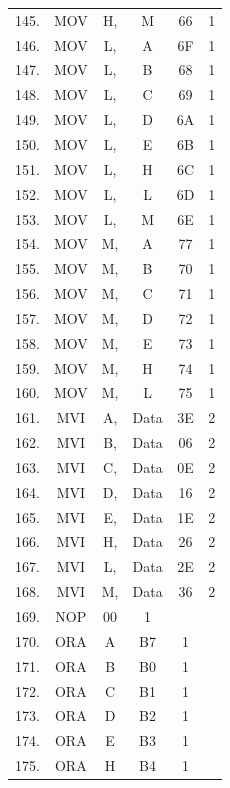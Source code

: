 \documentclass{scrreprt}
\begin{document}
\begin{longtable}{|c|c|c|c|c|c|}
145. & MOV  & H,           & M    & 66 & 1 \\
146. & MOV  & L,           & A    & 6F & 1 \\
147. & MOV  & L,           & B    & 68 & 1 \\
148. & MOV  & L,           & C    & 69 & 1 \\
149. & MOV  & L,           & D    & 6A & 1 \\
150. & MOV  & L,           & E    & 6B & 1 \\
151. & MOV  & L,           & H    & 6C & 1 \\
152. & MOV  & L,           & L    & 6D & 1 \\
153. & MOV  & L,           & M    & 6E & 1 \\
154. & MOV  & M,           & A    & 77 & 1 \\
155. & MOV  & M,           & B    & 70 & 1 \\
156. & MOV  & M,           & C    & 71 & 1 \\
157. & MOV  & M,           & D    & 72 & 1 \\
158. & MOV  & M,           & E    & 73 & 1 \\
159. & MOV  & M,           & H    & 74 & 1 \\
160. & MOV  & M,           & L    & 75 & 1 \\
161. & MVI  & A,           & Data & 3E & 2 \\
162. & MVI  & B,           & Data & 06 & 2 \\
163. & MVI  & C,           & Data & 0E & 2 \\
164. & MVI  & D,           & Data & 16 & 2 \\
165. & MVI  & E,           & Data & 1E & 2 \\
166. & MVI  & H,           & Data & 26 & 2 \\
167. & MVI  & L,           & Data & 2E & 2 \\
168. & MVI  & M,           & Data & 36 & 2 \\
169. & NOP  & 00           & 1    &    &   \\
170. & ORA  & A            & B7   & 1  &   \\
171. & ORA  & B            & B0   & 1  &   \\
172. & ORA  & C            & B1   & 1  &   \\
173. & ORA  & D            & B2   & 1  &   \\
174. & ORA  & E            & B3   & 1  &   \\
175. & ORA  & H            & B4   & 1  &   \\

\end{longtable}
\end{document}
